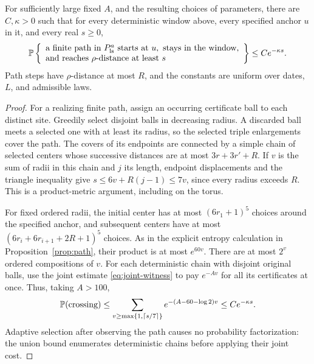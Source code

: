\begin{proposition}
\label{prop:ls-path}
For sufficiently large fixed \(A\), and the resulting choices of
parameters, there are \(C,\kappa>0\) such that for every
deterministic window above, every specified anchor \(u\) in it,
and every real \(s\ge0\),
\begin{equation}\label{eq:ls-path}
 \mathbb P\left\{\begin{array}{l}
 \text{a finite path in }P_{\rm ls}^a
       \text{ starts at }u,\text{ stays in the window,}\\
 \text{and reaches }\rho\text{-distance at least }s
 \end{array}\right\}\le Ce^{-\kappa s}.
\end{equation}
Path steps have \(\rho\)-distance at most \(R\), and the
constants are uniform over dates, \(L\), and admissible laws.
\end{proposition}
\begin{proof}
For a realizing finite path, assign an occurring certificate
ball to each distinct site. Greedily select disjoint balls
in decreasing radius. A discarded ball meets a selected
one with at least its radius, so the selected triple
enlargements cover the path. The covers of its endpoints
are connected by a simple chain of selected centers whose
successive distances are at most \(3r+3r'+R\).
If \(v\) is the sum of radii in this chain and \(j\) its
length, endpoint displacements and the triangle inequality
give \(s\le6v+R(j-1)\le7v\), since every radius exceeds \(R\).
This is a product-metric argument, including on the torus.

For fixed ordered radii, the initial center has at most
\((6r_1+1)^5\) choices around the specified anchor, and
subsequent centers have at most
\((6r_i+6r_{i+1}+2R+1)^5\) choices. As in the explicit
entropy calculation in Proposition~\ref{prop:path}, their
product is at most \(e^{60v}\).
There are at most \(2^v\) ordered compositions of \(v\).
For each deterministic chain with disjoint original balls,
use the joint estimate \eqref{eq:joint-witness} to pay
\(e^{-Av}\) for all its certificates at once.
Thus, taking \(A>100\),
\[
 \mathbb P(\text{crossing})\le
 \sum_{v\ge\max\{1,\lceil s/7\rceil\}}
        e^{-(A-60-\log2)v}
 \le Ce^{-\kappa s}.
\]
Adaptive selection after observing the path causes no
probability factorization: the union bound enumerates
deterministic chains before applying their joint cost.
\end{proof}

